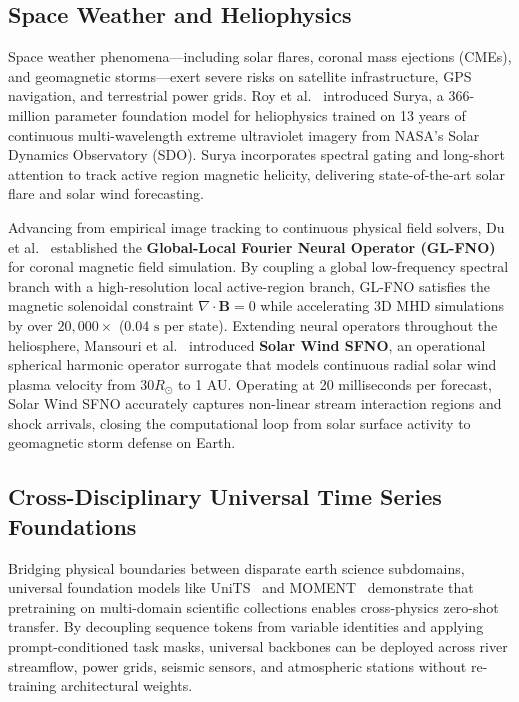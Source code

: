 \subsection{Space Weather and Heliophysics}
Space weather phenomena---including solar flares, coronal mass ejections (CMEs), and geomagnetic storms---exert severe risks on satellite infrastructure, GPS navigation, and terrestrial power grids. Roy et al.~\cite{roy2025surya} introduced Surya, a 366-million parameter foundation model for heliophysics trained on 13 years of continuous multi-wavelength extreme ultraviolet imagery from NASA's Solar Dynamics Observatory (SDO). Surya incorporates spectral gating and long-short attention to track active region magnetic helicity, delivering state-of-the-art solar flare and solar wind forecasting.

Advancing from empirical image tracking to continuous physical field solvers, Du et al.~\cite{du2024glfno} established the \textbf{Global-Local Fourier Neural Operator (GL-FNO)} for coronal magnetic field simulation. By coupling a global low-frequency spectral branch with a high-resolution local active-region branch, GL-FNO satisfies the magnetic solenoidal constraint $\nabla \cdot \mathbf{B} = 0$ while accelerating 3D MHD simulations by over \textbf{$20{,}000\times$} ($0.04\text{ s}$ per state). Extending neural operators throughout the heliosphere, Mansouri et al.~\cite{mansouri2025solarwind} introduced \textbf{Solar Wind SFNO}, an operational spherical harmonic operator surrogate that models continuous radial solar wind plasma velocity from $30 R_\odot$ to 1 AU. Operating at 20 milliseconds per forecast, Solar Wind SFNO accurately captures non-linear stream interaction regions and shock arrivals, closing the computational loop from solar surface activity to geomagnetic storm defense on Earth.

\subsection{Cross-Disciplinary Universal Time Series Foundations}
Bridging physical boundaries between disparate earth science subdomains, universal foundation models like UniTS~\cite{gao2024units} and MOMENT~\cite{goswami2024moment} demonstrate that pretraining on multi-domain scientific collections enables cross-physics zero-shot transfer. By decoupling sequence tokens from variable identities and applying prompt-conditioned task masks, universal backbones can be deployed across river streamflow, power grids, seismic sensors, and atmospheric stations without re-training architectural weights.

